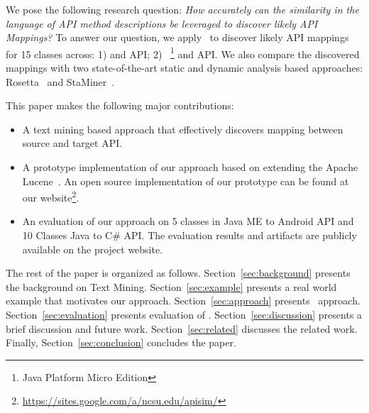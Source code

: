 We pose the following research question:
\textit{How accurately can the similarity in the language of API method descriptions
	be leveraged to discover likely API Mappings?}
To answer our question, we apply \tool\ to discover likely API mappings for 15 classes across:
1)  and  API; 2) ~\footnote{Java Platform Micro Edition} and  API.
We also compare the discovered mappings with two state-of-the-art static and dynamic analysis based approaches: Rosetta~\cite{Gokhale2013ICSE} and StaMiner~\cite{nguyen2014statistical}.


This paper makes the following major contributions:
\begin{itemize}
	\item A text mining based approach that effectively discovers mapping between source and target API.
	\item A prototype implementation of our approach based on extending the Apache Lucene~\cite{lucene}. An open source implementation of our prototype can be found at our website\footnote{\url{https://sites.google.com/a/ncsu.edu/apisim/}}. 
	\item An evaluation of our approach on 5 classes in Java ME to Android API and 10 Classes Java to C\# API. The evaluation results and artifacts are publicly available on the project website.
\end{itemize}


The rest of the paper is organized as follows.
Section~\ref{sec:background} presents the background on Text Mining.
Section~\ref{sec:example} presents a real world example that motivates our approach. Section~\ref{sec:approach} presents \tool\ approach.
Section~\ref{sec:evaluation} presents evaluation of \tool.
Section~\ref{sec:discussion} presents a brief discussion and future work.
Section~\ref{sec:related} discusses the related work.
Finally, Section~\ref{sec:conclusion} concludes the paper.


